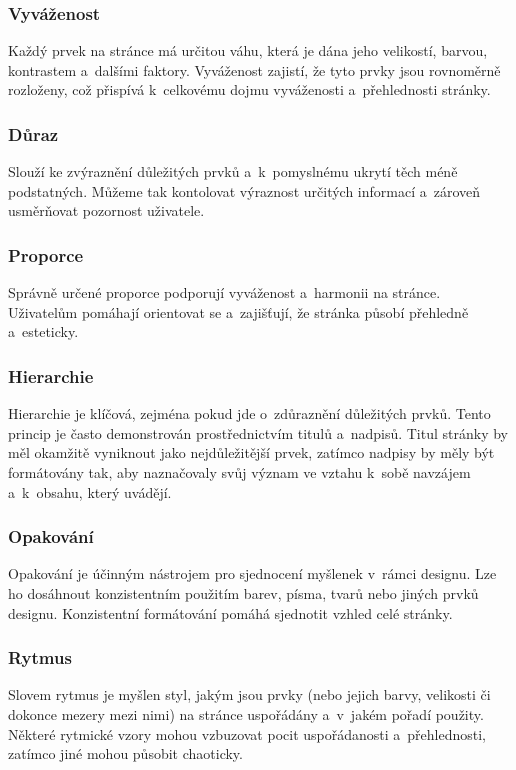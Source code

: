\subsubsection*{Vyváženost}
Každý prvek na stránce má určitou váhu, která je dána jeho velikostí, barvou, kontrastem a~dalšími faktory. Vyváženost zajistí, že tyto prvky jsou rovnoměrně rozloženy, což přispívá k~celkovému dojmu vyváženosti a~přehlednosti stránky.

\subsubsection*{Důraz}
Slouží ke zvýraznění důležitých prvků a~k~pomyslnému ukrytí těch méně podstatných. Můžeme tak kontolovat výraznost určitých informací a~zároveň usměrňovat pozornost uživatele.

\subsubsection*{Proporce}
Správně určené proporce podporují vyváženost a~harmonii na stránce. Uživatelům pomáhají orientovat se a~zajišťují, že stránka působí přehledně a~esteticky.

\subsubsection*{Hierarchie}
Hierarchie je klíčová, zejména pokud jde o~zdůraznění důležitých prvků. Tento princip je často demonstrován prostřednictvím titulů a~nadpisů. Titul stránky by měl okamžitě vyniknout jako nejdůležitější prvek, zatímco nadpisy by měly být formátovány tak, aby naznačovaly svůj význam ve vztahu k~sobě navzájem a~k~obsahu, který uvádějí.

\subsubsection*{Opakování}
Opakování je účinným nástrojem pro sjednocení myšlenek v~rámci designu. Lze ho dosáhnout konzistentním použitím barev, písma, tvarů nebo jiných prvků designu. Konzistentní formátování pomáhá sjednotit vzhled celé stránky.

\subsubsection*{Rytmus}
Slovem rytmus je myšlen styl, jakým jsou prvky (nebo jejich barvy, velikosti či dokonce mezery mezi nimi) na stránce uspořádány a~v~jakém pořadí použity. Některé rytmické vzory mohou vzbuzovat pocit uspořádanosti a~přehlednosti, zatímco jiné mohou působit chaoticky.

